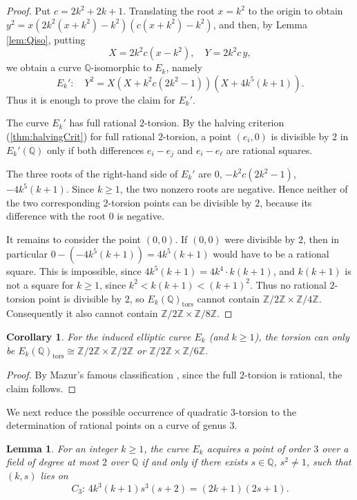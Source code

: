 \documentclass{article}
\theoremstyle{plain}
\newtheorem{lemma}[theorem]{Lemma}
\newtheorem{corollary}[theorem]{Corollary}
\newcommand{\Z}{\mathbb{Z}}
\newcommand{\Q}{\mathbb{Q}}
\newcommand{\tors}{\mathrm{tors}}
\begin{document}
\begin{proof}
Put \(c=2k^2+2k+1\). Translating the root \(x=k^2\) to the origin to obtain $y^2=x(2k^2(x+k^2)-k^2)(c(x+k^2)-k^2)$, and then, by Lemma \ref{lem:Qiso},
putting
\[
X=2k^2c(x-k^2),\quad Y=2k^2c\,y,
\]
we obtain a curve \(\Q\)-isomorphic to \(E_k\), namely
\[
E_k':\quad Y^2=X(X+k^2c(2k^2-1))(X+4k^5(k+1)).
\]
Thus it is enough to prove the claim for \(E_k'\).

The curve \(E_k'\) has full rational \(2\)-torsion. By the halving criterion (\cref{thm:halvingCrit}) for
full rational \(2\)-torsion, a point \((e_i,0)\) is divisible by \(2\) in
\(E_k'(\Q)\) only if both differences \(e_i-e_j\) and \(e_i-e_\ell\)
are rational squares.

The three roots of the right-hand side of \(E_k'\) are
\( 0\), \( -k^2c(2k^2-1)\),\( -4k^5(k+1)\).
Since \(k\geqslant 1\), the two nonzero roots are negative. Hence neither of the
two corresponding \(2\)-torsion points can be divisible by \(2\), because its
difference with the root \(0\) is negative.

It remains to consider the point \((0,0)\). If \((0,0)\) were divisible by
\(2\), then in particular
\( 0-(-4k^5(k+1))=4k^5(k+1) \) would have to be a rational square. This is impossible, since
\( 4k^5(k+1)=4k^4\cdot k(k+1)\), and \(k(k+1)\) is not a square for \(k\geqslant 1\), since  \( k^2<k(k+1)<(k+1)^2\).
Thus no rational \(2\)-torsion point is divisible by \(2\), so
\(E_k(\Q)_{\tors}\) cannot contain
\(\mathbb Z/2\mathbb Z\times\mathbb Z/4\mathbb Z\). Consequently it also
cannot contain \(\mathbb Z/2\mathbb Z\times\mathbb Z/8\mathbb Z\).
\end{proof}


\begin{corollary}
    For the induced elliptic curve $E_k$ (and $k\geqslant 1$), the torsion can only be $E_k(\Q)_\tors \cong \Z / 2\Z \times \Z / 2\Z$ or $\Z / 2\Z \times \Z / 6\Z$.
\end{corollary}
\begin{proof}
    By Mazur's famous classification \cite{mazurtorzija}, since the full $2$-torsion is rational, the claim follows.
\end{proof}

We next reduce the possible occurrence of quadratic \(3\)-torsion to the
determination of rational points on a curve of genus \(3\).

\begin{lemma}\label{lem:Dminusksq-3torsion-genus3}
For an integer \(k\geqslant 1\), the curve \(E_k\) acquires a
point of order \(3\) over a field of degree at most \(2\) over \(\Q\) if and
only if there exists \(s\in\Q\), \(s^2\neq 1\), such that \((k,s)\) lies on 
\[ C_3:\, 4k^3(k+1)s^3(s+2)=(2k+1)(2s+1). \]
\end{lemma}
\end{document}
